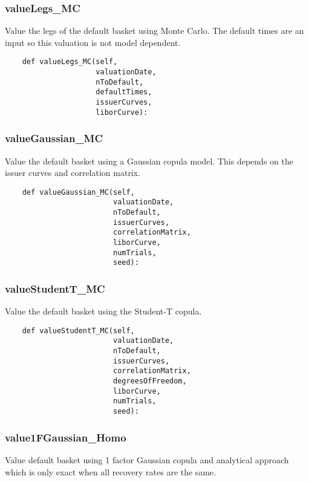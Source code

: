 \documentclass[twoside,11pt]{book}
\begin{document}
\subsubsection*{{\bf valueLegs\_MC}}
Value the legs of the default basket using Monte Carlo. The default times are an input so this valuation is not model dependent.  

\begin{lstlisting}
    def valueLegs_MC(self,
                     valuationDate,
                     nToDefault,
                     defaultTimes,
                     issuerCurves,
                     liborCurve):
\end{lstlisting}

\subsubsection*{{\bf valueGaussian\_MC}}
Value the default basket using a Gaussian copula model. This  depends on the issuer curves and correlation matrix.  

\begin{lstlisting}
    def valueGaussian_MC(self,
                         valuationDate,
                         nToDefault,
                         issuerCurves,
                         correlationMatrix,
                         liborCurve,
                         numTrials,
                         seed):
\end{lstlisting}

\subsubsection*{{\bf valueStudentT\_MC}}
Value the default basket using the Student-T copula.  

\begin{lstlisting}
    def valueStudentT_MC(self,
                         valuationDate,
                         nToDefault,
                         issuerCurves,
                         correlationMatrix,
                         degreesOfFreedom,
                         liborCurve,
                         numTrials,
                         seed):
\end{lstlisting}

\subsubsection*{{\bf value1FGaussian\_Homo}}
Value default basket using 1 factor Gaussian copula and analytical approach which is only exact when all recovery rates are the same.  
\end{document}
